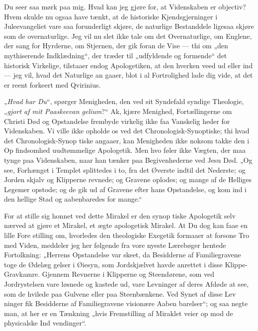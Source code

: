 \documentclass[12pt]{book}
\newcommand{\opage}[1]{\marginnote{\footnotesize\textit{[#1]}}}
\begin{document}
Du seer saa mørk paa mig. Hvad kan jeg gjøre for,
at Videnskaben er objectiv? Hvem skulde nu ogsaa have
tænkt, at de historiske Kjendsgjerninger i Juleevangeliet vare
saa forunderligt skjøre, de naturlige Bestanddele ligesaa
skjøre som de overnaturlige. Jeg vil nu slet ikke tale om
det Overnaturlige, om Englene, der sang for Hyrderne, om
Stjernen, der gik foran de Vise --- thi om „den mythiserende
Indklædning“, der træder til „udfyldende og formende“ det
historisk Virkelige, tilstaaer endog Apologetiken, at den
hverken veed ud eller ind --- jeg vil, hvad det Naturlige an\-%
\opage{50}\setcounter{footnote}{0}%
gaaer, blot i al Fortrolighed lade dig vide, at det er reent
forkeert med Qvirinius.

„\emph{Hvad har Du}“, spørger Menigheden, den ved sit
Syndefald syndige Theologie, „\emph{gjort af mit Paaskeevan\-%
gelium}?“ Ak, kjære Menighed, Fortællingerne om Christi
Død og Opstandelse frembyde virkelig ikke faa Vanskelig\-%
heder for Videnskaben. Vi ville ikke opholde os ved det
Chronologisk-Synoptiske; thi hvad det Chronologisk-Synop\-%
tiske angaaer, kan Menigheden ikke noksom takke den i Op\-%
findsomhed uudtømmelige Apologetik. Men hvo føler ikke
Vægten, der maa tynge paa Videnskaben, naar han tænker
paa Begivenhederne ved Jesu Død. „Og see, Forhænget i
Templet splittedes i to, fra det Øverste indtil det Nederste;
og Jorden skjalv og Klipperne revnede; og Gravene oplodes;
og mange af de Helliges Legemer opstode; og de gik ud af
Gravene efter hans Opstandelse, og kom ind i den hellige
Stad og aabenbaredes for mange.“

For at stille sig honnet ved dette Mirakel er den synop\-%
tiske Apologetik selv nærved at gjøre et Mirakel, et ægte
apologetisk Mirakel. At Du dog kan faae en lille Fore\-%
stilling om, hvorledes den theologiske Exegetik formaaer at
forsone Tro med Viden, meddeler jeg her følgende fra vore
nyeste Lærebøger hentede Fortolkning: „Herrens Opstandelse
var skeet, da Besidderne af Familiegravene toge de Ødelæg\-%
gelser i Øiesyn, som Jordskjælvet havde anrettet i disse
Klippe-Gravkamre. Gjennem Revnerne i Klipperne og
Steendørene, som ved Jordrystelsen vare løsnede og kastede ud,
vare Levninger af deres Afdøde at see, som de hvilede paa
Gulvene eller paa Steenbænkene. Ved Synet af disse Lev\-%
ninger fik Besidderne af Familiegravene visionære Aaben\-%
barelser“; og saa negte man, at her er en Tænkning „hvis
Fremstilling af Miraklet veier op mod de physicalske Ind\-%
vendinger“.
\end{document}

